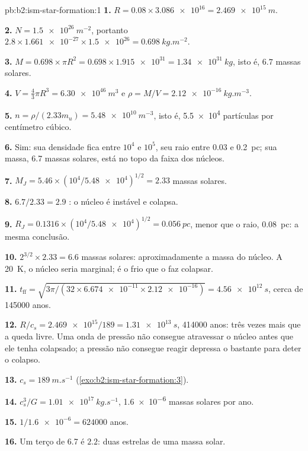 \begin{solution}{pb:b2:ism-star-formation:1}
\textbf{1.} $R = 0.08\times\num{3.086e16} = \qty{2.469e15}{m}$.

\textbf{2.} $N = \qty{1.5e26}{m^{-2}}$, portanto $2.8\times\num{1.661e-27}\times\num{1.5e26} =
\qty{0.698}{kg.m^{-2}}$.

\textbf{3.} $M = 0.698\times\pi R^2 = 0.698\times\num{1.915e31} = \qty{1.34e31}{kg}$,
isto é, $6.7$ massas solares.

\textbf{4.} $V = \tfrac43\pi R^3 = \qty{6.30e46}{m^3}$ e
$\rho = M/V = \qty{2.12e-16}{kg.m^{-3}}$.

\textbf{5.} $n = \rho/(2.33m_u) = \qty{5.48e10}{m^{-3}}$, isto é, \num{5.5e4} partículas
por centímetro cúbico.

\textbf{6.} Sim: sua densidade fica entre $10^4$ e $10^5$, seu raio entre 0.03 e
\qty{0.2}{pc}; sua massa, 6.7 massas solares, está no topo da faixa dos núcleos.

\textbf{7.} $M_J = 5.46\times(10^4/\num{5.48e4})^{1/2} = 2.33$ massas solares.

\textbf{8.} $6.7/2.33 = 2.9$ : o núcleo é instável e colapsa.

\textbf{9.} $R_J = 0.1316\times(10^4/\num{5.48e4})^{1/2} = \qty{0.056}{pc}$, menor que
o raio, \qty{0.08}{pc}: a mesma conclusão.

\textbf{10.} $2^{3/2}\times2.33 = 6.6$ massas solares: aproximadamente a massa do núcleo. A
\qty{20}{K}, o núcleo seria marginal; é o frio que o faz colapsar.

\textbf{11.} $t_{\mathrm{ff}} = \sqrt{3\pi/(32\times\num{6.674e-11}\times\num{2.12e-16})}
= \qty{4.56e12}{s}$, cerca de \num{145000} anos.

\textbf{12.} $R/c_s = \num{2.469e15}/189 = \qty{1.31e13}{s}$, \num{414000} anos: três
vezes mais que a queda livre. Uma onda de pressão não consegue atravessar o núcleo antes que ele
tenha colapsado; a pressão não consegue reagir depressa o bastante para deter o colapso.

\textbf{13.} $c_s = \qty{189}{m.s^{-1}}$ (\cref{exo:b2:ism-star-formation:3}).

\textbf{14.} $c_s^3/G = \qty{1.01e17}{kg.s^{-1}}$, \num{1.6e-6} massas solares por ano.

\textbf{15.} $1/\num{1.6e-6} = \num{624000}$ anos.

\textbf{16.} Um terço de 6.7 é $2.2$: duas estrelas de uma massa solar.


\end{solution}
